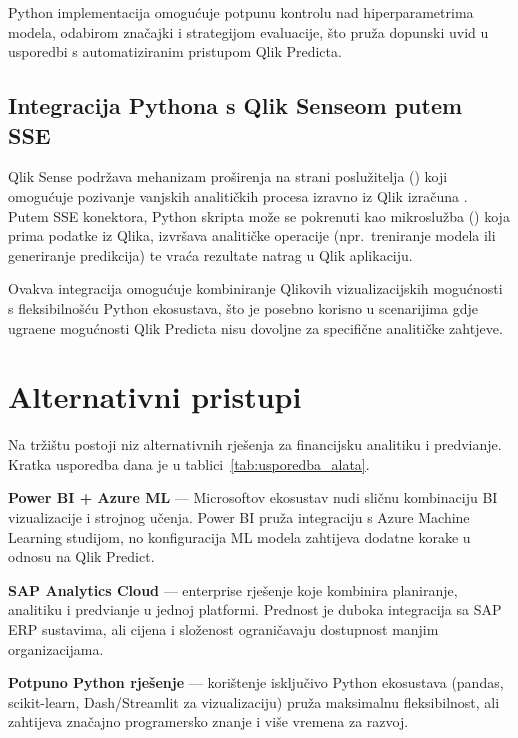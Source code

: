 \documentclass[zavrsnirad]{fer}
\begin{document}
Python implementacija omogu\'{c}uje potpunu kontrolu nad hiperparametrima modela, odabirom zna\v{c}ajki i strategijom evaluacije, \v{s}to pru\v{z}a dopunski uvid u usporedbi s automatiziranim pristupom Qlik Predicta.

\subsection{Integracija Pythona s Qlik Senseom putem SSE}
\label{subsec:qlik_sse}

Qlik Sense podr\v{z}ava mehanizam pro\v{s}irenja na strani poslu\v{z}itelja () koji omogu\'{c}uje pozivanje vanjskih analiti\v{c}kih procesa izravno iz Qlik izra\v{c}una \citep{qliksse2024}. Putem SSE konektora, Python skripta mo\v{z}e se pokrenuti kao mikroslu\v{z}ba () koja prima podatke iz Qlika, izvr\v{s}ava analiti\v{c}ke operacije (npr.\ treniranje modela ili generiranje predikcija) te vra\'{c}a rezultate natrag u Qlik aplikaciju.

Ovakva integracija omogu\'{c}uje kombiniranje Qlikovih vizualizacijskih mogućnosti s fleksibilno\v{s}\'{c}u Python ekosustava, \v{s}to je posebno korisno u scenarijima gdje ugra\dj ene mogu\'{c}nosti Qlik Predicta nisu dovoljne za specifi\v{c}ne analiti\v{c}ke zahtjeve.

\section{Alternativni pristupi}
\label{sec:alternative}

Na tr\v{z}i\v{s}tu postoji niz alternativnih rje\v{s}enja za financijsku analitiku i predvi\dj anje. Kratka usporedba dana je u tablici~\ref{tab:usporedba_alata}.

\textbf{Power BI + Azure ML} --- Microsoftov ekosustav nudi sli\v{c}nu kombinaciju BI vizualizacije i strojnog u\v{c}enja. Power BI pru\v{z}a integraciju s Azure Machine Learning studijom, no konfiguracija ML modela zahtijeva dodatne korake u odnosu na Qlik Predict.

\textbf{SAP Analytics Cloud} --- enterprise rje\v{s}enje koje kombinira planiranje, analitiku i predvi\dj anje u jednoj platformi. Prednost je duboka integracija sa SAP ERP sustavima, ali cijena i slo\v{z}enost ograni\v{c}avaju dostupnost manjim organizacijama.

\textbf{Potpuno Python rje\v{s}enje} --- kori\v{s}tenje isklju\v{c}ivo Python ekosustava (pandas, scikit-learn, Dash/Streamlit za vizualizaciju) pru\v{z}a maksimalnu fleksibilnost, ali zahtijeva zna\v{c}ajno programersko znanje i vi\v{s}e vremena za razvoj.
\end{document}

